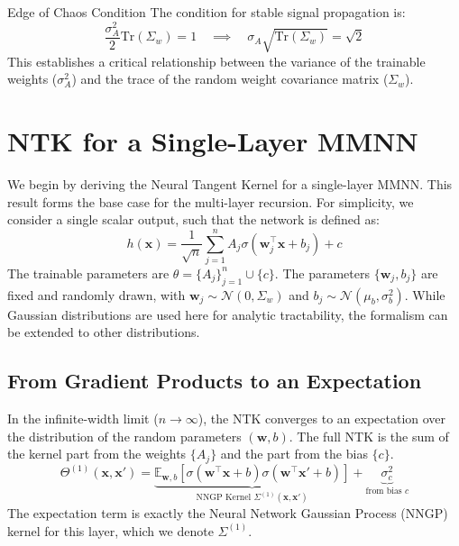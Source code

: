 \documentclass[12pt]{article}
\begin{document}
\begin{block}{Edge of Chaos Condition}
The condition for stable signal propagation is:
\begin{equation}
    \frac{\sigma_A^2}{2} \text{Tr}(\Sigma_w) = 1 \quad \implies \quad \sigma_A \sqrt{\text{Tr}(\Sigma_w)} = \sqrt{2}
\end{equation}
This establishes a critical relationship between the variance of the trainable weights ($\sigma_A^2$) and the trace of the random weight covariance matrix ($\Sigma_w$).
\end{block}

\section{NTK for a Single-Layer MMNN}
\label{sec:single_layer_mmfn}
We begin by deriving the Neural Tangent Kernel for a single-layer MMNN. This result forms the base case for the multi-layer recursion. For simplicity, we consider a single scalar output, such that the network is defined as:
\begin{equation}
    h(\bm{x}) = \frac{1}{\sqrt{n}} \sum_{j=1}^n A_j \sigma(\bm{w}_j^\top \bm{x} + b_j) + c
\end{equation}
The trainable parameters are $\theta = \{A_j\}_{j=1}^n \cup \{c\}$. The parameters $\{\bm{w}_j, b_j\}$ are fixed and randomly drawn, with $\bm{w}_j \sim \mathcal{N}(0, \Sigma_w)$ and $b_j \sim \mathcal{N}(\mu_b, \sigma_b^2)$. While Gaussian distributions are used here for analytic tractability, the formalism can be extended to other distributions.

\subsection{From Gradient Products to an Expectation}
In the infinite-width limit ($n \to \infty$), the NTK converges to an expectation over the distribution of the random parameters $(\bm{w}, b)$. The full NTK is the sum of the kernel part from the weights $\{A_j\}$ and the part from the bias $\{c\}$.
\begin{equation}
\label{eq:ntk_expectation}
    \Theta^{(1)}(\bm{x}, \bm{x}') = \underbrace{\mathbb{E}_{\bm{w},b} \left[ \sigma(\bm{w}^\top \bm{x} + b)\sigma(\bm{w}^\top \bm{x}' + b) \right]}_{\text{NNGP Kernel } \Sigma^{(1)}(\bm{x}, \bm{x}')} + \underbrace{\sigma_c^2}_{\text{from bias } c}
\end{equation}
The expectation term is exactly the Neural Network Gaussian Process (NNGP) kernel for this layer, which we denote $\Sigma^{(1)}$.
\end{document}
